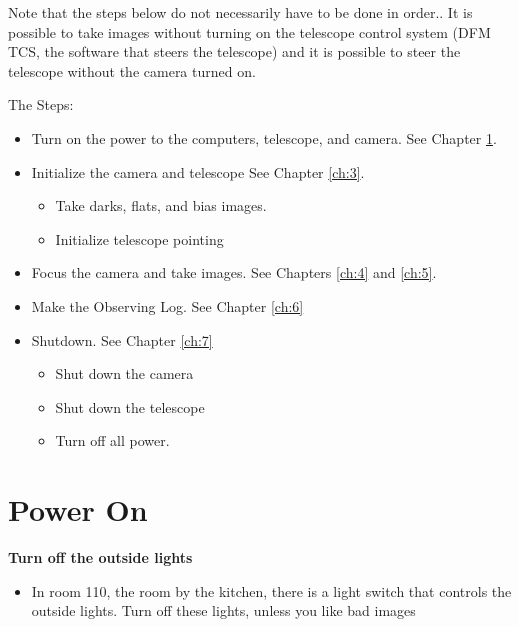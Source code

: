 \documentclass[letterpaper, 12pt]{report}
\begin{document}
Note that the steps below do not necessarily have to be done in order.. It is possible to take images without turning on the telescope control system (DFM TCS, the software that steers the telescope) and it is possible to steer the telescope without the camera turned on.

The Steps:
\begin{itemize}
	\item Turn on the power to the computers, telescope, and camera. See Chapter \ref{ch:2}.
	\item Initialize the camera and telescope See Chapter \ref{ch:3}.
	\begin{itemize}
		\item Take darks, flats, and bias images.
		\item Initialize telescope pointing
	\end{itemize}
	\item Focus the camera and take images. See Chapters \ref{ch:4} and \ref{ch:5}.
	\item Make the Observing Log. See Chapter \ref{ch:6}
	\item Shutdown. See Chapter \ref{ch:7}
	\begin{itemize}
		\item Shut down the camera
		\item Shut down the telescope
		\item Turn off all power.
	\end{itemize}
\end{itemize}

\newpage

\chapter{Power On}\label{ch:2}

\textbf{Turn off the outside lights}
\begin{itemize}
	\item In room 110, the room by the kitchen, there is a light switch that controls the outside lights. Turn off these lights, unless you like bad images
\end{itemize}
\end{document}
